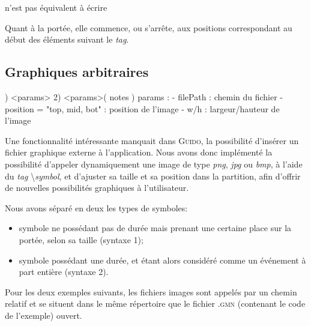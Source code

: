 \documentclass{article}
\newenvironment{gmncode}	{\vspace{-2mm}\small\verbatim}{\endverbatim\vspace{-2mm}}
\newcommand{\guido}			{\textsc{Guido}}
\begin{document}
\begin{center}
\begin{gmncode}
[\meter<"4/4">\clef\staffOff a b\staffOn c]
\end{gmncode}
\bigskip

n'est pas équivalent à écrire 
\\
\begin{gmncode}
[\staffOff\meter<"4/4">\clef a b\staffOn c]
\end{gmncode} 
\end{center}

Quant à la portée, elle commence, ou s'arrête, aux positions correspondant au début des éléments suivant le \emph{tag}.


\subsection{Graphiques arbitraires}\label{subsec:graphiquesAbstraites}
\bigskip

\begin{gmncode}
1) \symbol<params>
2) \symbol<params>( notes )
  params : 
    - filePath :
      chemin du fichier
    - position = "top, mid, bot" :
      position de l'image
    - w/h :
      largeur/hauteur de l'image
\end{gmncode}

Une fonctionnalité intéressante manquait dans \guido, la possibilité d'insérer un fichier graphique externe à l'application. Nous avons donc implémenté la possibilité d'appeler dynamiquement une image de type \emph{png}, \emph{jpg} ou \emph{bmp}, à l'aide du \emph{tag} \textbackslash{}\emph{symbol}, et d'ajuster sa taille et sa position dans la partition, afin d'offrir de nouvelles possibilités graphiques à l'utilisateur.

Nous avons séparé en deux les types de symboles:
\begin{itemize}
	\item symbole ne possédant pas de durée mais prenant une certaine place sur la portée, selon sa taille (syntaxe 1);
	\item symbole possédant une durée, et étant alors considéré comme un événement à part entière (syntaxe 2).
\end{itemize}

Pour les deux exemples suivants, les fichiers images sont appelés par un chemin relatif et se situent dans le même répertoire que le fichier \textsc{.gmn} (contenant le code de l'exemple) ouvert.
\end{document}

